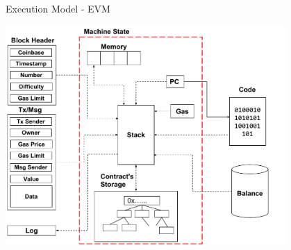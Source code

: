 \begin{frame}{Execution Model - EVM~\cite{bib:yellow}}
\begin{center}
\includegraphics[width=0.8\textwidth]{./img/evm-overview}
\end{center}
\end{frame}




